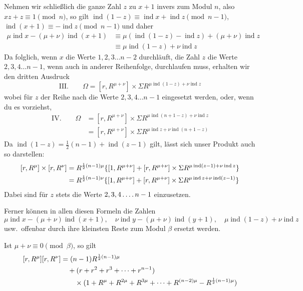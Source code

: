 Nehmen wir schließlich die ganze Zahl $z$ zu $x+1$ invers zum
Modul $n$, also $xz+z\equiv1\pmod n$, so gilt $\operatorname{ind}(1-z)\equiv\operatorname{ind}x+\operatorname{ind}z\pmod{n-1}$, $\operatorname{ind}(x+1)\equiv-\operatorname{ind}z\pmod{n-1}$ und daher
\[
\begin{aligned}
\mu\operatorname{ind}x-(\mu+\nu)\operatorname{ind}(x+1)&\equiv\mu(\operatorname{ind}(1-z)-\operatorname{ind}z)+(\mu+\nu)\operatorname{ind}z\\
&\equiv\mu\operatorname{ind}(1-z)+\nu\operatorname{ind}z
\end{aligned}
\]
Da folglich, wenn $x$ die Werte $1,2,3\dots n-2$ durchläuft, die Zahl $z$ die Werte $2,3,4\dots n-1$, wenn auch in anderer Reihenfolge, durchlaufen muss, erhalten wir den dritten Ausdruck
\begingroup{}
\[
\text{III.}\qquad\Omega=[r,R^{\mu+\nu}]\times\Sigma R^{\mu\operatorname{ind}(1-z)+\nu\operatorname{ind}z}
\]
\endgroup
wobei für $z$ der Reihe nach die Werte $2,3,4\dots n-1$ eingesetzt werden, oder, wenn du es vorziehst,
\[
\begin{aligned}
\text{IV.}\qquad\Omega&=[r,R^{\mu+\nu}]\times\Sigma R^{\mu\operatorname{ind}(n+1-z)+\nu\operatorname{ind}z}\\
&=[r,R^{\mu+\nu}]\times\Sigma R^{\mu\operatorname{ind}z+\nu\operatorname{ind}(n+1-z)}
\end{aligned}
\]
Da $\operatorname{ind}(1-z)=\frac12(n-1)+\operatorname{ind}(z-1)$ gilt, lässt sich unser Produkt auch so darstellen:
\[
\begin{aligned}
\relax[r,R^\mu]\times[r,R^\nu]&=R^{\frac12(n-1)\mu}\{[1,R^{\mu+\nu}]+[r,R^{\mu+\nu}]\times\Sigma R^{\mu\operatorname{ind}(z-1)+\nu\operatorname{ind}z}\}\\
&=R^{\frac12(n-1)\nu}\{[1,R^{\mu+\nu}]+[r,R^{\mu+\nu}]\times\Sigma R^{\mu\operatorname{ind}z+\nu\operatorname{ind}(z-1)}\}
\end{aligned}
\]
Dabei sind für $z$ stets die Werte $2,3,4\mathinner{.\,.\,.\,.} n-1$ einzusetzen.

Ferner können in allen diesen Formeln die Zahlen
\[
\mu\operatorname{ind}x-(\mu+\nu)\operatorname{ind}(x+1),\quad\nu\operatorname{ind}y-(\mu+\nu)\operatorname{ind}(y+1),\quad\mu\operatorname{ind}(1-z)+\nu\operatorname{ind}z
\]
usw.\ offenbar durch ihre kleinsten Reste zum Modul $\beta$ ersetzt werden.

Ist $\mu+\nu\equiv0\pmod\beta$, so gilt
\[
\begin{aligned}
\relax[r,R^\mu][r,R^\nu]&=(n-1)R^{\frac12(n-1)\mu}\\
&\quad+(r+r^2+r^3+\dots+r^{n-1})\\
&\qquad\times(1+R^\mu+R^{2\mu}+R^{3\mu}+\dots+R^{(n-2)\mu}-R^{\frac12(n-1)\mu})
\end{aligned}
\]

